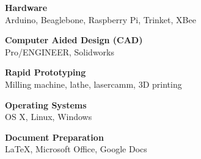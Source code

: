 \documentclass[]{res}
\begin{document}
\begin{resume}
\textbf{Hardware} \\
Arduino, Beaglebone, Raspberry Pi, Trinket, XBee

\textbf{Computer Aided Design (CAD)} \\
Pro/ENGINEER, Solidworks

\textbf{Rapid Prototyping} \\
Milling machine, lathe, lasercamm, 3D printing

\textbf{Operating Systems} \\
OS X, Linux, Windows

\textbf{Document Preparation} \\
LaTeX, Microsoft Office, Google Docs


\end{resume}
\end{document}
